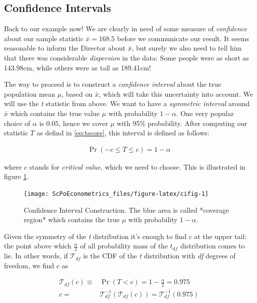 \documentclass[]{book}
\begin{document}
\hypertarget{CI}{%
\subsection{Confidence Intervals}\label{CI}}

Back to our example now! We are clearly in need of some measure of \emph{confidence} about our sample statistic \(\bar{x} = 168.5\) before we communicate our result. It seems reasonable to inform the Director about \(\bar{x}\), but surely we also need to tell him that there was considerable \emph{dispersion} in the data: Some people were as short as 143.98cm, while others were as tall as 189.41cm!

The way to proceed is to construct a \emph{confidence interval} about the true population mean \(\mu\), based on \(\bar{x}\), which will take this uncertainty into account. We will use the \emph{t} statistic from above. We want to have a \emph{symmetric interval} around \(\bar{x}\) which contains the true value \(\mu\) with probability \(1-\alpha\). One very popular choice of \(\alpha\) is \(0.05\), hence we cover \(\mu\) with 95\% probability. After computing our statistic \(T\) as defind in \eqref{eq:tscore}, this interval is defined as follows:

\begin{align}
\Pr \left(-c \leq T \leq c \right) = 1-\alpha \label{eq:ci}
\end{align}

where \(c\) stands for \emph{critical value}, which we need to choose. This is illustrated in figure \ref{fig:cifig}.

\begin{figure}

{\centering \texttt{[image: ScPoEconometrics\_files/figure-latex/cifig-1]} 

}

\caption{Confidence Interval Construction. The blue area is called *coverage region* which contains the true $\mu$ with probability $1-\alpha$.}\label{fig:cifig}
\end{figure}

Given the symmetry of the \emph{t} distribution it's enough to find \(c\) at the upper tail: the point above which \(\frac{\alpha}{2}\) of all probability mass of the \(t_{df}\) distribution comes to lie. In other words, if \(\mathcal{T}_{df}\) is the CDF of the \emph{t} distribution with \emph{df} degrees of freedom, we find \(c\) as

\begin{align}
\mathcal{T}_{df}(c)\equiv& \Pr \left( T < c \right)  = 1-\frac{\alpha}{2} = 0.975 \\\label{eq:ci1}
c =& \mathcal{T}_{df}^{-1}(\mathcal{T}_{df}(c)) = \mathcal{T}_{df}^{-1}(0.975)
\end{align}
\end{document}
